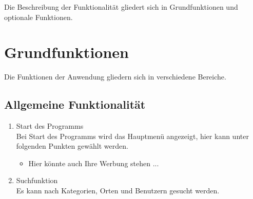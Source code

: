 
Die Beschreibung der Funktionalität gliedert sich in Grundfunktionen und optionale Funktionen.

\section{Grundfunktionen}

Die Funktionen der Anwendung gliedern sich in verschiedene Bereiche.

\subsection{Allgemeine Funktionalität}
\begin{enumerate}[align=left, label={\textbf{\textbackslash F00\arabic*0\textbackslash}} ]
	\item Start des Programms \\
	Bei Start des Programms wird das Hauptmenü angezeigt, hier kann unter folgenden Punkten gewählt werden.
	\begin{itemize}
		\item Hier könnte auch Ihre Werbung stehen ...
	\end{itemize}
	\item Suchfunktion \label{:PF_Suchfunktion} \\
	Es kann nach Kategorien, Orten und Benutzern gesucht werden. 

\end{enumerate}
